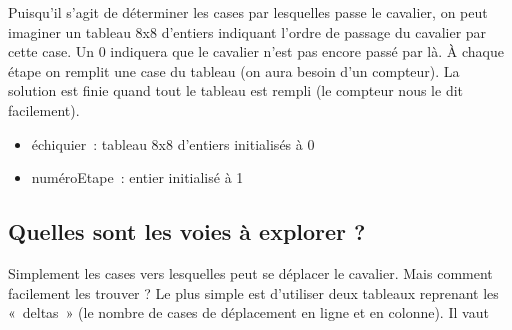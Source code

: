 		Puisqu'il s'agit de déterminer les cases par lesquelles passe 
		le cavalier, on peut imaginer un tableau 8x8 d'entiers
		indiquant l'ordre de passage du cavalier par cette case. 
		Un 0 indiquera que le cavalier n'est pas encore passé par là.
		À chaque étape on remplit une case du tableau (on aura besoin 
		d'un compteur). La solution est finie quand tout le
		tableau est rempli (le compteur nous le dit facilement).

		\begin{itemize}
			\item {
				échiquier~: tableau 8x8 d'entiers initialisés à 0}
			\item {
				numéroEtape~: entier initialisé à 1}
		\end{itemize}
		
	\subsection{Quelles sont les voies à explorer ?}

		Simplement les cases vers lesquelles peut se déplacer le 
		cavalier. Mais comment facilement les trouver ? Le plus simple
		est d'utiliser deux tableaux reprenant les «~deltas~» (le nombre 
		de cases de déplacement en ligne et en colonne). Il vaut

		\begin{center}
			\tabletail{}
			\tablelasttail{}
			\begin{supertabular}{|m{1.306cm}|m{0.379cm}|m{0.379cm}|m{0.379cm}|m{0.23900001cm}|m{0.23900001cm}|m{0.379cm}|m{0.379cm}|m{0.37300003cm}|}
			\hline
			 &
			 &
			 &
			 &
			 &
			 &
			 &
			 &
			\centering{}\\\hline
			\end{supertabular}
		\end{center}
		
